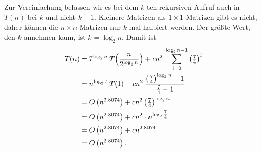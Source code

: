 \documentclass{scrartcl}
\numberwithin{equation}{section}
\begin{document}
Zur Vereinfachung belassen wir es bei dem $k$-ten rekursiven Aufruf auch in $T(n)$ bei $k$ und nicht $k + 1$. Kleinere Matrizen als $1 \times 1$ Matrizen gibt es nicht, daher können die $n \times n$ Matrizen nur $k$ mal halbiert werden. Der größte Wert, den $k$ annehmen kann, ist $k = \log_{2}n$. Damit ist
\begin{align*}
	\vphantom{\rule{0pt}{2.5ex}} T(n) &= 7^{\log_{2}n} \: T\Big(\frac{n}{2^{\log_{2}n}}\Big) + cn^2 \: \sum_{i = 0}^{\log_{2}n-1} \left(\tfrac{7}{4}\right)^i \\
	\vphantom{\rule{0pt}{2.5ex}} &= n^{\log_{2}7} \: T(1) + cn^2 \:\frac{\left(\tfrac{7}{4}\right)^{\log_{2}n} - 1}{\tfrac{7}{4} - 1} \\
	\vphantom{\rule{0pt}{2.5ex}} &= O\left(n^{2.8074}\right) + cn^2 \left(\tfrac{7}{4}\right)^{\log_{2}n} \\
	\vphantom{\rule{0pt}{2.5ex}} &= O\left(n^{2.8074}\right) + cn^2 \cdot n^{\log_{2}\tfrac{7}{4}} \\
	\vphantom{\rule{0pt}{2.5ex}} &= O\left(n^{2.8074}\right) + cn^{2.8074} \\
	\vphantom{\rule{0pt}{2.5ex}} &= O\left(n^{2.8074}\right).
\end{align*}
\end{document}
